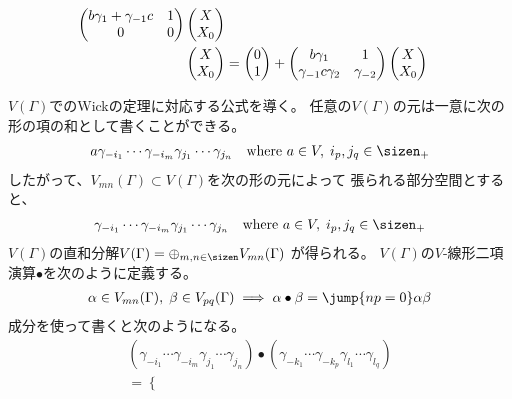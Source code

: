 {\begin{todo}[湧いてきた問題]
\begin{itemize}
\begin{equation*}
\begin{split}
\begin{pmatrix}
					b\gamma_1 + \gamma_{-1}c & 1 \\ 0 & 0
				\end{pmatrix}\begin{pmatrix}{X}\\{X_0}\end{pmatrix} \\
				\begin{pmatrix}{X}\\{X_0}\end{pmatrix} &= \begin{pmatrix}{0}\\{1}\end{pmatrix} + \begin{pmatrix}
					b\gamma_1 & 1 \\ \gamma_{-1}c\gamma_2 & \gamma_{-2}
				\end{pmatrix}\begin{pmatrix}{X}\\{X_0}\end{pmatrix} \\
			\end{split}\end{equation*}
		\end{itemize} %
	\end{todo} %

	\begin{todo}[Wickの定理]\label{todo:Wickの定理} %
		$V(\Gamma)$でのWickの定理に対応する公式を導く。
		任意の$V(\Gamma)$の元は一意に次の形の項の和として書くことができる。
		\begin{equation*}\begin{split}
			a\gamma_{-i_1}\cdots\gamma_{-i_m}\gamma_{j_1}\cdots\gamma_{j_n}
			\quad\text{where } a\in V,\; i_p,j_q\in\sizen_+
		\end{split}\end{equation*}
		したがって、$V_{mn}(\Gamma)\subset V(\Gamma)$を次の形の元によって
		張られる部分空間とすると、
		\begin{equation*}\begin{split}
			\gamma_{-i_1}\cdots\gamma_{-i_m}\gamma_{j_1}\cdots\gamma_{j_n}
			\quad\text{where } a\in V,\; i_p,j_q\in\sizen_+
		\end{split}\end{equation*}
		$V(\Gamma)$の直和分解$V(\Gamma)=\oplus_{m,n\in\sizen}V_{mn}(\Gamma)$
		が得られる。
		$V(\Gamma)$の$V$-線形二項演算$\bullet$を次のように定義する。
		\begin{equation*}\begin{split}
			\alpha\in V_{mn}(\Gamma),\;\beta\in V_{pq}(\Gamma)
			\implies \alpha\bullet\beta = \jump{np=0}\alpha\beta
		\end{split}\end{equation*}
		成分を使って書くと次のようになる。
		\begin{equation*}\begin{split}
			(\gamma_{-i_1}\cdots\gamma_{-i_m}\gamma_{j_1}\cdots\gamma_{j_n})
			\bullet 
			(\gamma_{-k_1}\cdots\gamma_{-k_p}\gamma_{l_1}\cdots\gamma_{l_q}) \\
			= \begin{cases}

\end{cases}
\end{split}
\end{equation*}
\end{todo}}

